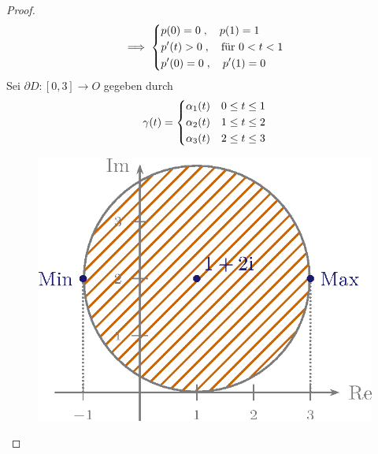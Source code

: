 \documentclass[a4paper,10pt]{scrbook}
\begin{document}
\begin{theorem}[Hilfssatz]
\begin{proof}
    \begin{align*}
      \implies
      \begin{dcases}
        p(0) = 0 \; , \quad p(1) = 1 \\
        p'(t) > 0 \; , \quad \text{für } 0 < t < 1 \\
        p'(0) = 0 \; , \quad p'(1) = 0
      \end{dcases}
    \end{align*}
    Sei $\partial D : [0,3] \to O$ gegeben durch
    \begin{align*}
      \gamma(t) =
      \begin{dcases}
        \alpha_1(t) & 0 \leq t \leq 1 \\
        \alpha_2(t) & 1 \leq t \leq 2 \\
        \alpha_3(t) & 2 \leq t \leq 3
      \end{dcases}
    \end{align*}

    \begin{figure}[H]
      \centering
      \includegraphics[scale=0.2]{images/ana3-tmp-20}
    \end{figure}


\end{proof}
\end{theorem}
\end{document}
